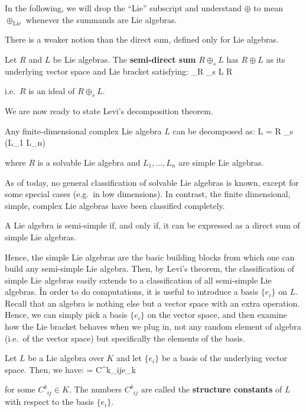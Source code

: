 In the following, we will drop the ``Lie'' subscript and understand $\oplus$ to mean $\oplus_\mathrm{Lie}$ whenever
the summands are Lie algebras.
\ed

There is a weaker notion than the direct sum, defined only for Lie algebras.

Let $R$ and $L$ be Lie algebras. The \textbf{semi-direct sum} $R\oplus_s L$ has $R\oplus L$ as its underlying vector
space and Lie bracket satisfying:
\bse
[R,L]_{R \oplus_s L} \se R
\ese

i.e.\ $R$ is an ideal of $R\oplus_s L$.
\ed

We are now ready to state Levi's decomposition theorem.

\bt[Levi]
Any finite-dimensional complex Lie algebra $L$ can be decomposed as:
\bse
L = R \oplus_s (L_1 \oplus\cdots \oplus L_n)
\ese

where $R$ is a solvable Lie algebra and $L_1, \ldots,L_n$ are simple Lie algebras.
\et

As of today, no general classification of solvable Lie algebras is known, except for some special cases (e.g.\ in low
dimensions). In contrast, the finite dimensional, simple, complex Lie algebras have been classified completely.

\bt[]
A Lie algebra is semi-simple if, and only if, it can be expressed as a direct sum of simple Lie algebras.
\et

Hence, the simple Lie algebras are the basic building blocks from which one can build any semi-simple Lie algebra.
Then, by Levi's theorem, the classification of simple Lie algebras easily extends to a classification of all
semi-simple Lie algebras. \v

In order to do computations, it is useful to introduce a basis $\{e_i\}$ on $L$. Recall that an algebra is nothing
else but a vector space with an extra operation. Hence, we can simply pick a basis $\{e_i\}$ on the vector space, and
then examine how the Lie bracket behaves when we plug in, not any random element of algebra (i.e.\ of the vector
space) but specifically the elements of the basis.

Let $L$ be a Lie algebra over $K$ and let $\{e_i\}$ be a basis of the underlying vector space. Then, we have:
\bse
[e_i,e_j] = C^{k}_{\phantom{k}ij}e_k
\ese

for some $C^{k}_{\phantom{k}ij}\in K$. The numbers $C^{k}_{\phantom{k}ij}$ are called the \textbf{structure
constants} of $L$ with respect to the basis $\{ e_i \}$.
\ed

